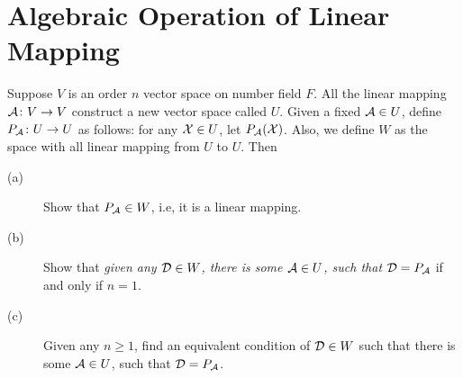 \section{Algebraic Operation of Linear Mapping}

\begin{pro}%
	Suppose $V$ is an order $n$ vector space on number field $F$. All the linear mapping $\mathcal{A}\colon V\to V$ construct a new vector space called $U$. Given a fixed $\mathcal{A}\in U$, define $P_{\mathcal{A}}\colon U\to U$ as follows: for any $\mathcal{X}\in U$, let $P_{\mathcal{A}}(\mathcal{X})$. Also, we define $W$ as the space with all linear mapping from $U$ to $U$. Then
	\begin{description}
	\item[(a)] Show that $P_{\mathcal{A}}\in W$, i.e, it is a linear mapping.
	\item[(b)] Show that \emph{given any $\mathcal{D}\in W$, there is some $\mathcal{A}\in U$, such that $\mathcal{D}=P_{\mathcal{A}}$} if and
	only if $n=1$.
	\item[(c)] Given any $n\geq 1$, find an equivalent condition of $\mathcal{D}\in W$ such that there is some $\mathcal{A}\in U$, such that $\mathcal{D}=P_{\mathcal{A}}$.
	\end{description}
\end{pro}


